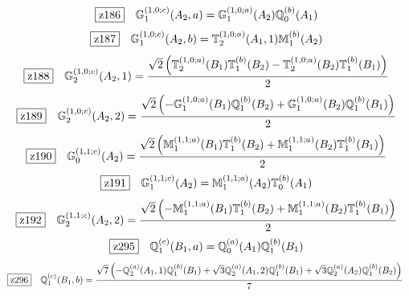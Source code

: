 \documentclass[fleqn,10pt,landscape]{jsarticle}
\begin{document}
\begin{dmath*}
\hspace*{3mm}\fbox{z186}\quad \mathbb{G}_{1}^{(1,0;c)}(A_{2},a)=\mathbb{G}_{1}^{(1,0;a)}(A_{2}) \mathbb{Q}_{0}^{(b)}(A_{1})
\end{dmath*}
\begin{dmath*}
\hspace*{3mm}\fbox{z187}\quad \mathbb{G}_{1}^{(1,0;c)}(A_{2},b)=\mathbb{T}_{2}^{(1,0;a)}(A_{1},1) \mathbb{M}_{1}^{(b)}(A_{2})
\end{dmath*}
\begin{dmath*}
\hspace*{3mm}\fbox{z188}\quad \mathbb{G}_{2}^{(1,0;c)}(A_{2},1)=\frac{\sqrt{2} \left(\mathbb{T}_{2}^{(1,0;a)}(B_{1}) \mathbb{T}_{1}^{(b)}(B_{2}) - \mathbb{T}_{2}^{(1,0;a)}(B_{2}) \mathbb{T}_{1}^{(b)}(B_{1})\right)}{2}
\end{dmath*}
\begin{dmath*}
\hspace*{3mm}\fbox{z189}\quad \mathbb{G}_{2}^{(1,0;c)}(A_{2},2)=\frac{\sqrt{2} \left(- \mathbb{G}_{1}^{(1,0;a)}(B_{1}) \mathbb{Q}_{1}^{(b)}(B_{2}) + \mathbb{G}_{1}^{(1,0;a)}(B_{2}) \mathbb{Q}_{1}^{(b)}(B_{1})\right)}{2}
\end{dmath*}
\begin{dmath*}
\hspace*{3mm}\fbox{z190}\quad \mathbb{G}_{0}^{(1,1;c)}(A_{2})=\frac{\sqrt{2} \left(\mathbb{M}_{1}^{(1,1;a)}(B_{1}) \mathbb{T}_{1}^{(b)}(B_{2}) + \mathbb{M}_{1}^{(1,1;a)}(B_{2}) \mathbb{T}_{1}^{(b)}(B_{1})\right)}{2}
\end{dmath*}
\begin{dmath*}
\hspace*{3mm}\fbox{z191}\quad \mathbb{G}_{1}^{(1,1;c)}(A_{2})=\mathbb{M}_{1}^{(1,1;a)}(A_{2}) \mathbb{T}_{0}^{(b)}(A_{1})
\end{dmath*}
\begin{dmath*}
\hspace*{3mm}\fbox{z192}\quad \mathbb{G}_{2}^{(1,1;c)}(A_{2},2)=\frac{\sqrt{2} \left(- \mathbb{M}_{1}^{(1,1;a)}(B_{1}) \mathbb{T}_{1}^{(b)}(B_{2}) + \mathbb{M}_{1}^{(1,1;a)}(B_{2}) \mathbb{T}_{1}^{(b)}(B_{1})\right)}{2}
\end{dmath*}
\begin{dmath*}
\hspace*{3mm}\fbox{z295}\quad \mathbb{Q}_{1}^{(c)}(B_{1},a)=\mathbb{Q}_{0}^{(a)}(A_{1}) \mathbb{Q}_{1}^{(b)}(B_{1})
\end{dmath*}
\begin{dmath*}
\hspace*{3mm}\fbox{z296}\quad \mathbb{Q}_{1}^{(c)}(B_{1},b)=\frac{\sqrt{7} \left(- \mathbb{Q}_{2}^{(a)}(A_{1},1) \mathbb{Q}_{1}^{(b)}(B_{1}) + \sqrt{3} \mathbb{Q}_{2}^{(a)}(A_{1},2) \mathbb{Q}_{1}^{(b)}(B_{1}) + \sqrt{3} \mathbb{Q}_{2}^{(a)}(A_{2}) \mathbb{Q}_{1}^{(b)}(B_{2})\right)}{7}
\end{dmath*}
\end{document}
